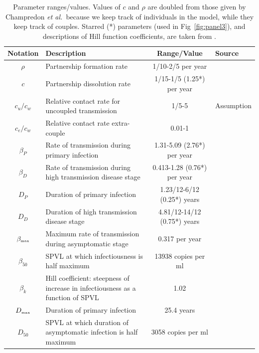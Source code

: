 \documentclass[10pt,letterpaper]{article}
\renewcommand{\figurename}{Fig}
\newcommand{\etal}{\textit{et al.}}
\newcommand{\tsub}[2]{#1_{{\textrm{\tiny #2}}}}
\begin{document}

\begin{table}[h!]
\caption{Parameter ranges/values.  Values of $c$ and $\rho$ are doubled from those given by Champredon \etal\ because we keep track of individuals in the model, while they keep track of couples. Starred (*) parameters (used in \figurename~\ref{fig:panel3}), and descriptions of Hill function coefficients, are taken from \cite{shirreff_transmission_2011}.}
\centering
\begin{tabular}{c p{2in} c l}
\hline 
Notation & Description & Range/Value & Source\\
\hline %
$\rho$ & Partnership formation rate & 1/10-2/5 per year & \cite{champredon_hiv_2013} \\
$c$ & Partnership dissolution rate & 1/15-1/5 (1.25*) per year & \cite{champredon_hiv_2013} \\
$c_u/c_w$ & Relative contact rate for uncoupled transmission & 1/5-5 & Assumption \\
$c_e/c_w$ & Relative contact rate extra-couple & 0.01-1 & \cite{champredon_hiv_2013} \\
$\beta_P$ & Rate of transmission during primary infection & 1.31-5.09 (2.76*) per year & \cite{hollingsworth_hiv1_2008} \\
$\beta_D$ & Rate of transmission during high transmission disease stage & 0.413-1.28 (0.76*) per year & \cite{hollingsworth_hiv1_2008} \\
$D_P$ & Duration of primary infection & 1.23/12-6/12 (0.25*) years & \cite{hollingsworth_hiv1_2008} \\
$D_D$ & Duration of high transmission disease stage & 4.81/12-14/12 (0.75*) years & \cite{hollingsworth_hiv1_2008} \\
$\tsub{\beta}{max}$ & Maximum rate of transmission during asymptomatic stage & 0.317 per year & \cite{shirreff_transmission_2011} \\
$\beta_{50}$ & SPVL at which infectiousness is half maximum & 13938 copies per ml & \cite{shirreff_transmission_2011} \\
$\beta_k$ & Hill coefficient: steepness of increase in infectiousness as a function of SPVL & 1.02 & \cite{shirreff_transmission_2011} \\
$\tsub{D}{max}$ & Duration of primary infection & 25.4 years & \cite{shirreff_transmission_2011} \\
$D_{50}$ & SPVL at which duration of asymptomatic infection is half maximum & 3058 copies per ml & \cite{shirreff_transmission_2011} \\

\end{tabular}
\end{table}
\end{document}
